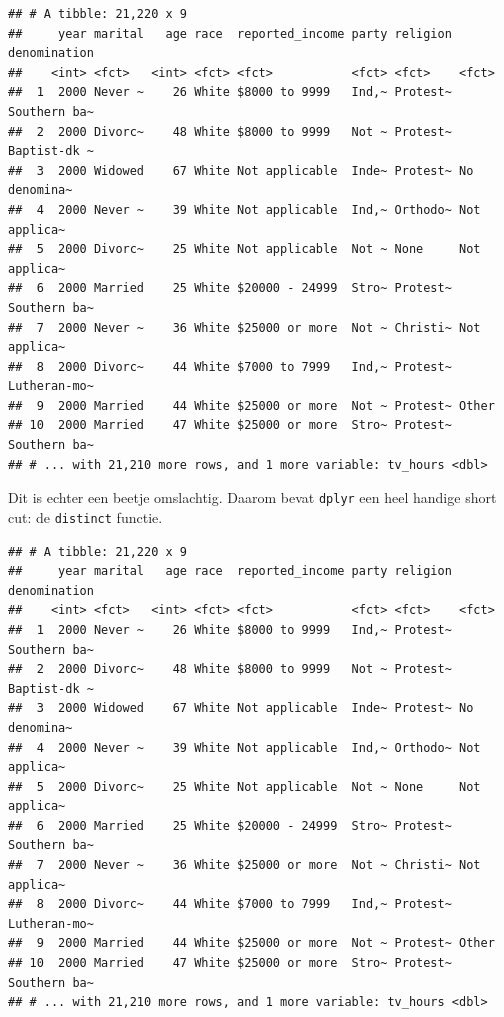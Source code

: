 \documentclass[]{tufte-book}
\newenvironment{Shaded}{}{}
\newcommand{\KeywordTok}[1]{\textcolor[rgb]{0.00,0.44,0.13}{\textbf{#1}}}
\newcommand{\NormalTok}[1]{#1}
\newcommand{\OperatorTok}[1]{\textcolor[rgb]{0.40,0.40,0.40}{#1}}
\newcommand{\StringTok}[1]{\textcolor[rgb]{0.25,0.44,0.63}{#1}}
\begin{document}
\begin{verbatim}
## # A tibble: 21,220 x 9
##     year marital   age race  reported_income party religion denomination
##    <int> <fct>   <int> <fct> <fct>           <fct> <fct>    <fct>       
##  1  2000 Never ~    26 White $8000 to 9999   Ind,~ Protest~ Southern ba~
##  2  2000 Divorc~    48 White $8000 to 9999   Not ~ Protest~ Baptist-dk ~
##  3  2000 Widowed    67 White Not applicable  Inde~ Protest~ No denomina~
##  4  2000 Never ~    39 White Not applicable  Ind,~ Orthodo~ Not applica~
##  5  2000 Divorc~    25 White Not applicable  Not ~ None     Not applica~
##  6  2000 Married    25 White $20000 - 24999  Stro~ Protest~ Southern ba~
##  7  2000 Never ~    36 White $25000 or more  Not ~ Christi~ Not applica~
##  8  2000 Divorc~    44 White $7000 to 7999   Ind,~ Protest~ Lutheran-mo~
##  9  2000 Married    44 White $25000 or more  Not ~ Protest~ Other       
## 10  2000 Married    47 White $25000 or more  Stro~ Protest~ Southern ba~
## # ... with 21,210 more rows, and 1 more variable: tv_hours <dbl>
\end{verbatim}

Dit is echter een beetje omslachtig. Daarom bevat \texttt{dplyr} een heel handige short cut: de \texttt{distinct} functie.

\begin{Shaded}
\end{Shaded}

\begin{verbatim}
## # A tibble: 21,220 x 9
##     year marital   age race  reported_income party religion denomination
##    <int> <fct>   <int> <fct> <fct>           <fct> <fct>    <fct>       
##  1  2000 Never ~    26 White $8000 to 9999   Ind,~ Protest~ Southern ba~
##  2  2000 Divorc~    48 White $8000 to 9999   Not ~ Protest~ Baptist-dk ~
##  3  2000 Widowed    67 White Not applicable  Inde~ Protest~ No denomina~
##  4  2000 Never ~    39 White Not applicable  Ind,~ Orthodo~ Not applica~
##  5  2000 Divorc~    25 White Not applicable  Not ~ None     Not applica~
##  6  2000 Married    25 White $20000 - 24999  Stro~ Protest~ Southern ba~
##  7  2000 Never ~    36 White $25000 or more  Not ~ Christi~ Not applica~
##  8  2000 Divorc~    44 White $7000 to 7999   Ind,~ Protest~ Lutheran-mo~
##  9  2000 Married    44 White $25000 or more  Not ~ Protest~ Other       
## 10  2000 Married    47 White $25000 or more  Stro~ Protest~ Southern ba~
## # ... with 21,210 more rows, and 1 more variable: tv_hours <dbl>
\end{verbatim}
\end{document}
